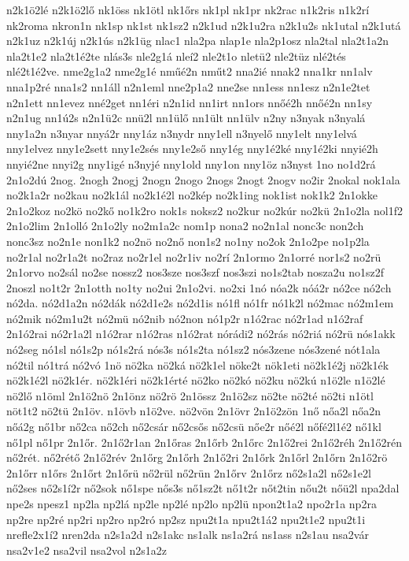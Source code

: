 {n2k1ö2lé
n2k1ö2lő
nk1öss
nk1ötl
nk1őrs
nk1pl
nk1pr
nk2rac
n1k2ris
n1k2rí
nk2roma
nkron1n
nk1sp
nk1st
nk1sz2
n2k1ud
n2k1u2ra
n2k1u2s
nk1utal
n2k1utá
n2k1uz
n2k1új
n2k1ús
n2k1üg
nlac1
nla2pa
nlap1e
nla2p1osz
nla2tal
nla2t1a2n
nla2t1e2
nla2t1é2te
nlás3s
nle2g1á
nleí2
nle2t1o
nletü2
nle2tüz
nlé2tés
nlé2t1é2ve.
nme2g1a2
nme2g1é
nműé2n
nműt2
nna2ié
nnak2
nna1kr
nn1alv
nna1p2ré
nna1s2
nn1áll
n2n1eml
nne2p1a2
nne2se
nn1ess
nn1esz
n2n1e2tet
n2n1ett
nn1evez
nné2get
nn1éri
n2n1id
nn1irt
nn1ors
nnőé2h
nnőé2n
nn1sy
n2n1ug
nn1ú2s
n2n1ü2c
nnü2l
nn1ülő
nn1ült
nn1ülv
n2ny
n3nyak
n3nyalá
nny1a2n
n3nyar
nnyá2r
nny1áz
n3nydr
nny1ell
n3nyelő
nny1elt
nny1elvá
nny1elvez
nny1e2sett
nny1e2sés
nny1e2ső
nny1ég
nny1é2ké
nny1é2ki
nnyié2h
nnyié2ne
nnyi2g
nny1igé
n3nyjé
nny1old
nny1on
nny1öz
n3nyst
1no
no1d2rá
2n1o2dú
2nog.
2nogh
2nogj
2nogn
2nogo
2nogs
2nogt
2nogv
no2ir
2nokal
nok1ala
no2k1a2r
no2kau
no2k1ál
no2k1é2l
no2kép
no2k1ing
nok1ist
nok1k2
2n1okke
2n1o2koz
no2kö
no2kő
no1k2ro
nok1s
noksz2
no2kur
no2kúr
no2kü
2n1o2la
nol1f2
2n1o2lim
2n1olló
2n1o2ly
no2m1a2c
nom1p
nona2
no2n1al
nonc3c
non2ch
nonc3sz
no2n1e
non1k2
no2nö
no2nő
non1s2
no1ny
no2ok
2n1o2pe
no1p2la
no2r1al
no2r1a2t
no2raz
no2r1el
no2r1iv
no2rí
2n1ormo
2n1orré
nor1s2
no2rü
2n1orvo
no2sál
no2se
nossz2
nos3sze
nos3szf
nos3szi
no1s2tab
nosza2u
no1sz2f
2noszl
no1t2r
2n1otth
no1ty
no2ui
2n1o2vi.
no2xi
1nó
nóa2k
nóá2r
nó2ce
nó2ch
nó2da.
nó2d1a2n
nó2dák
nó2d1e2s
nó2d1is
nó1fl
nó1fr
nó1k2l
nó2mac
nó2m1em
nó2mik
nó2m1u2t
nó2mü
nó2nib
nó2non
nó1p2r
n1ó2rac
nó2r1ad
n1ó2raf
2n1ó2rai
nó2r1a2l
n1ó2rar
n1ó2ras
n1ó2rat
nórádi2
nó2rás
nó2riá
nó2rü
nós1akk
nó2seg
nó1sl
nó1s2p
nó1s2rá
nós3s
nó1s2ta
nó1sz2
nós3zene
nós3zené
nót1ala
nó2til
nó1trá
nó2vó
1nö
nö2ka
nö2ká
nö2k1el
nöke2t
nök1eti
nö2k1é2j
nö2k1ék
nö2k1é2l
nö2k1ér.
nö2k1éri
nö2k1érté
nö2ko
nö2kó
nö2ku
nö2kú
n1ö2le
n1ö2lé
nö2lő
n1öml
2n1ö2nö
2n1önz
nö2rö
2n1össz
2n1ö2sz
nö2te
nö2té
nö2ti
n1ötl
nöt1t2
nö2tü
2n1öv.
n1övb
n1ö2ve.
nö2vön
2n1övr
2n1ö2zön
1nő
nőa2l
nőa2n
nőá2g
nő1br
nő2ca
nő2ch
nő2csár
nő2csős
nő2csü
nőe2r
nőé2l
nőfé2l1é2
nő1kl
nő1pl
nő1pr
2n1őr.
2n1ő2r1an
2n1őras
2n1őrb
2n1őrc
2n1ő2rei
2n1ő2réh
2n1ő2rén
nő2rét.
nő2rétő
2n1ő2rév
2n1őrg
2n1őrh
2n1ő2ri
2n1őrk
2n1őrl
2n1őrn
2n1ő2rö
2n1őrr
n1őrs
2n1őrt
2n1őrü
nő2rül
nő2rün
2n1őrv
2n1őrz
nő2s1a2l
nő2s1e2l
nő2ses
nő2s1í2r
nő2sok
nő1spe
nős3s
nő1sz2t
nő1t2r
nőt2tin
nőu2t
nőü2l
npa2dal
npe2s
npesz1
np2la
np2lá
np2le
np2lé
np2lo
np2lü
npon2t1a2
npo2r1a
np2ra
np2re
np2ré
np2ri
np2ro
np2ró
np2sz
npu2t1a
npu2t1á2
npu2t1e2
npu2t1i
nrefle2x1í2
nren2da
n2s1a2d
n2s1akc
ns1alk
ns1a2rá
ns1ass
n2s1au
nsa2vár
nsa2v1e2
nsa2vil
nsa2vol
n2s1a2z
}
